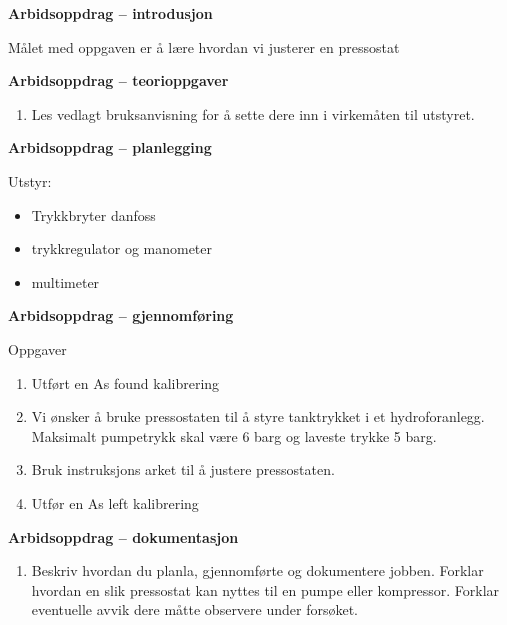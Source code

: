 

\noindent

\vskip 5pt


\textbf{Arbidsoppdrag -- introdusjon}

Målet med oppgaven er å lære hvordan vi justerer en pressostat



\textbf{Arbidsoppdrag -- teorioppgaver}

\begin{enumerate}
	\item Les vedlagt bruksanvisning for å sette dere inn i virkemåten til utstyret.
\end{enumerate}
\textbf{Arbidsoppdrag -- planlegging}

Utstyr:
\begin{itemize}[noitemsep]
	\item Trykkbryter danfoss
	\item trykkregulator og manometer
	\item multimeter
\end{itemize}

\textbf{Arbidsoppdrag -- gjennomføring}

Oppgaver\begin{enumerate}
	\item Utført en As found kalibrering 
	\item Vi ønsker å bruke pressostaten til å styre tanktrykket i et hydroforanlegg. Maksimalt pumpetrykk skal være 6 barg og laveste trykke 5 barg. 
	\item Bruk instruksjons arket til å justere pressostaten.
	\item Utfør en As left kalibrering 
\end{enumerate}
\textbf{Arbidsoppdrag -- dokumentasjon}

\begin{enumerate}
	\item Beskriv hvordan du planla, gjennomførte og dokumentere jobben. Forklar hvordan en slik pressostat kan nyttes til en pumpe eller kompressor. Forklar eventuelle avvik dere måtte observere under forsøket. 
\end{enumerate}








\noindent

\vfil \eject

















